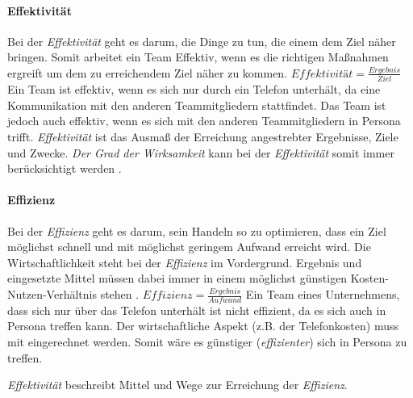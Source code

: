 \documentclass[a4paper,11pt]{article}%
\renewcommand{\\}{\vspace*{0.5\baselineskip} \newline}
\begin{document}
\paragraph{Effektivität}
Bei der \textit{Effektivität} geht es darum, die Dinge zu tun, die einem dem Ziel näher bringen. 
Somit arbeitet ein Team Effektiv, wenn es die richtigen Maßnahmen ergreift um dem zu erreichendem Ziel näher zu kommen.\\
$Effektivität = \frac{Ergebnis}{Ziel}$ \\
Ein Team ist effektiv, wenn es sich nur durch ein Telefon unterhält, da eine Kommunikation mit den anderen Teammitgliedern stattfindet. Das Team ist jedoch auch effektiv, wenn es sich mit den anderen Teammitgliedern in Persona trifft.
\textit{Effektivität} ist das Ausmaß der Erreichung angestrebter Ergebnisse, Ziele und Zwecke.
\textit{Der Grad der Wirksamkeit} kann bei der \textit{Effektivität} somit immer berücksichtigt werden \citep{eichhorn2005prinzip}.

\paragraph{Effizienz}
Bei der \textit{Effizienz} geht es darum, sein Handeln so zu optimieren, dass ein Ziel möglichst schnell und mit möglichst geringem Aufwand erreicht wird. Die Wirtschaftlichkeit steht bei der \textit{Effizienz} im Vordergrund. Ergebnis und eingesetzte Mittel müssen dabei immer in einem möglichst günstigen Kosten-Nutzen-Verhältnis stehen \citep{eichhorn2005prinzip}.\\
$Effizienz = \frac{Ergebnis}{Aufwand}$\\
Ein Team eines Unternehmens, dass sich nur über das Telefon unterhält ist nicht effizient, da es sich auch in Persona treffen kann.
Der wirtschaftliche Aspekt (z.B. der Telefonkosten) muss mit eingerechnet werden. Somit wäre es günstiger (\textit{effizienter}) sich in Persona zu treffen.

\textit{Effektivität} beschreibt Mittel und Wege zur Erreichung der \textit{Effizienz}.

%
%
\newpage
\end{document}
